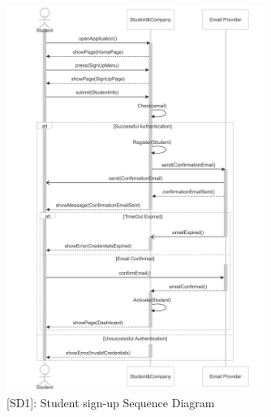 \begin{figure}[H]
    \centering
    \includegraphics[width=0.75\textwidth]{Latex/Images/RASD/SequenceDiagrams/StudentSignUpSequenceDiagram.png}
    \caption{[SD1]: Student sign-up Sequence Diagram}
    \label{fig:SD1}
\end{figure}
\clearpage

